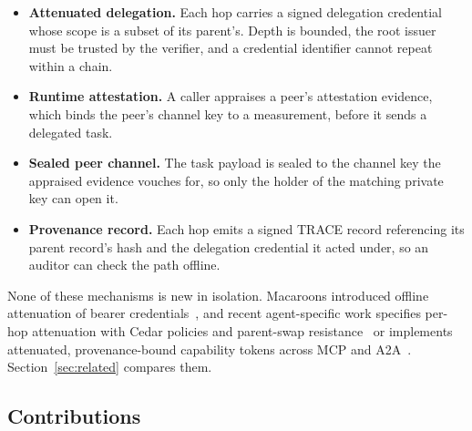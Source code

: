 \begin{itemize}[leftmargin=1.5em]
  \item \textbf{Attenuated delegation.} Each hop carries a signed delegation credential whose
    scope is a subset of its parent's. Depth is bounded, the root issuer must be trusted by the
    verifier, and a credential identifier cannot repeat within a chain.
  \item \textbf{Runtime attestation.} A caller appraises a peer's attestation evidence, which
    binds the peer's channel key to a measurement, before it sends a delegated task.
  \item \textbf{Sealed peer channel.} The task payload is sealed to the channel key the appraised
    evidence vouches for, so only the holder of the matching private key can open it.
  \item \textbf{Provenance record.} Each hop emits a signed TRACE record referencing its parent
    record's hash and the delegation credential it acted under, so an auditor can check the
    path offline.
\end{itemize}

None of these mechanisms is new in isolation. Macaroons introduced offline attenuation of bearer
credentials~\citep{macaroons2014}, and recent agent-specific work specifies per-hop attenuation
with Cedar policies and parent-swap resistance~\citep{pedigree2026} or implements attenuated,
provenance-bound capability tokens across MCP and A2A~\citep{aip2026}. Section~\ref{sec:related}
compares them.

\subsection*{Contributions}

